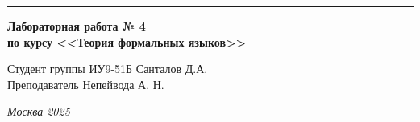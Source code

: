 \documentclass[a4paper, 14pt]{extarticle}
\begin{document}
\begin{titlepage}
\vspace*{-16pt}
\hspace{30pt}\rule{0.866\textwidth}{0.4pt}
  
\vspace{11em}

\begin{center}
\Large {\bf Лабораторная работа № 4} \\ 
\large {\bf по курсу <<Теория формальных языков>>} \\
\end{center}\normalsize

\vspace{8em}


\begin{flushright}
  {Студент группы ИУ9-51Б Санталов Д.А. \hspace*{15pt}\\ 
  \vspace{2ex}
  Преподаватель Непейвода А. Н.\hspace*{15pt}}
\end{flushright}

\bigskip

\vfill
 

\begin{center}
\textsl{Москва 2025}
\end{center}
\end{titlepage}

\renewcommand{\ttdefault}{pcr}

\setlength{\tabcolsep}{3pt}
\newpage
\setcounter{page}{2}

\tableofcontents
\newpage
\end{document}
